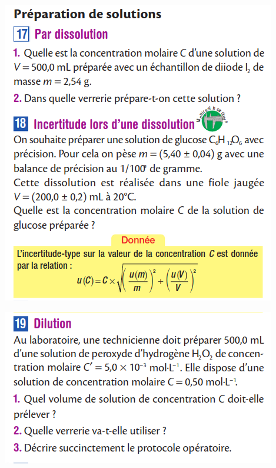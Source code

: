 \documentclass[10pt]{article}
\newcommand{\myscale}{0.41}
\begin{document}
\begin{center}
\begin{minipage}[c]{0.45\textwidth}
		\includegraphics[scale=\myscale]{assets/17-18.png}



	\end{minipage}


	\begin{minipage}[c]{0.45\textwidth}
		\centering
		\includegraphics[scale=\myscale]{assets/19.png}


\end{minipage}
\end{center}
\end{document}
